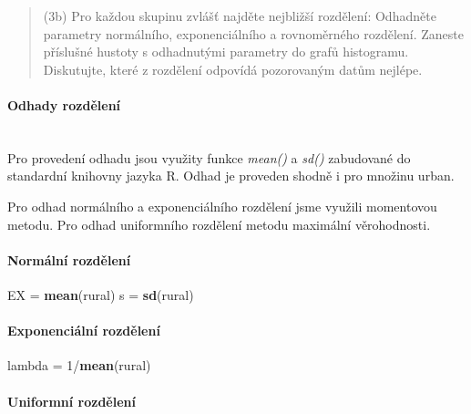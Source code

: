 \documentclass[11pt]{article}
\newenvironment{Shaded}{}{}
\newcommand{\KeywordTok}[1]{\textcolor[rgb]{0.00,0.44,0.13}{\textbf{{#1}}}}
\newcommand{\DecValTok}[1]{\textcolor[rgb]{0.25,0.63,0.44}{{#1}}}
\newcommand{\StringTok}[1]{\textcolor[rgb]{0.25,0.44,0.63}{{#1}}}
\newcommand{\NormalTok}[1]{{#1}}
\begin{document}
\begin{quote}
(3b) Pro každou skupinu zvlášť najděte nejbližší rozdělení: Odhadněte
parametry normálního, exponenciálního a rovnoměrného rozdělení. Zaneste
příslušné hustoty s odhadnutými parametry do grafů histogramu.
Diskutujte, které z rozdělení odpovídá pozorovaným datům nejlépe.
\end{quote}

    \paragraph{Odhady rozdělení}\label{odhady-rozdux11blenuxed}\mbox{}\\

Pro provedení odhadu jsou využity funkce \emph{mean()} a \emph{sd()}
zabudované do standardní knihovny jazyka R. Odhad je proveden shodně i
pro množinu urban.

Pro odhad normálního a exponenciálního rozdělení jsme využili momentovou
metodu. Pro odhad uniformního rozdělení metodu maximální věrohodnosti.

\paragraph{Normální rozdělení}\label{normuxe1lnuxed-rozdux11blenuxed}

\begin{Shaded}
\begin{Highlighting}[]
\NormalTok{EX =}\StringTok{ }\KeywordTok{mean}\NormalTok{(rural)}
\NormalTok{s =}\StringTok{ }\KeywordTok{sd}\NormalTok{(rural)}
\end{Highlighting}
\end{Shaded}

\paragraph{Exponenciální
rozdělení}\label{exponenciuxe1lnuxed-rozdux11blenuxed}

\begin{Shaded}
\begin{Highlighting}[]
\NormalTok{lambda =}\StringTok{ }\DecValTok{1}\NormalTok{/}\KeywordTok{mean}\NormalTok{(rural)}
\end{Highlighting}
\end{Shaded}

\paragraph{Uniformní rozdělení}\label{uniformnuxed-rozdux11blenuxed}
\end{document}
